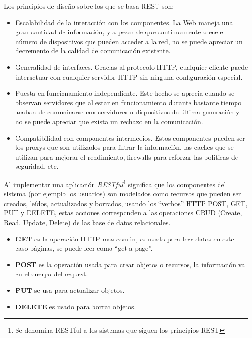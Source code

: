Los principios de diseño sobre los que se basa REST son: \cite{rest_web_service}
\begin{itemize}
  \item Escalabilidad de la interacción con los componentes. La Web maneja una gran cantidad de información, y a pesar de que continuamente crece el número de dispositivos que pueden acceder a la red, no se puede apreciar un decremento de la calidad de comunicación existente.

  \item Generalidad de interfaces. Gracias al protocolo HTTP, cualquier cliente puede interactuar con cualquier servidor HTTP sin ninguna configuración especial.

  \item Puesta en funcionamiento independiente. Este hecho se aprecia cuando se observan servidores que al estar en funcionamiento durante bastante tiempo acaban de comunicarse con servidores o dispositivos de última generación y no se puede apreciar que exista un rechazo en la comunicación.

  \item Compatibilidad con componentes intermedios. Estos componentes pueden ser los proxys que son utilizados para filtrar la información, las caches que se utilizan para mejorar el rendimiento, firewalls para reforzar las políticas de seguridad, etc.

\end{itemize}

 Al implementar una aplicación \emph{RESTful}\footnote{Se denomina RESTful a los sistemas que siguen los principios REST} significa que los componentes del sistema (por ejemplo los usuarios) son modelados como recursos que pueden ser creados, leídos, actualizados y borrados, usando los ``verbos'' HTTP POST, GET, PUT y DELETE, estas acciones corresponden a las operaciones CRUD (Create, Read, Update, Delete) de las base de datos relacionales.\\

\begin{itemize}
  \item \textbf{GET} es la operación HTTP más común, es usado para leer
  datos en este caso páginas, se puede leer como ``get a page''.
  \item \textbf{POST} es la operación usada para crear objetos o recursos, la información va en el cuerpo del request.
  \item \textbf{PUT} se usa para actualizar objetos.
  \item \textbf{DELETE} es usado para borrar objetos.
\end{itemize}

